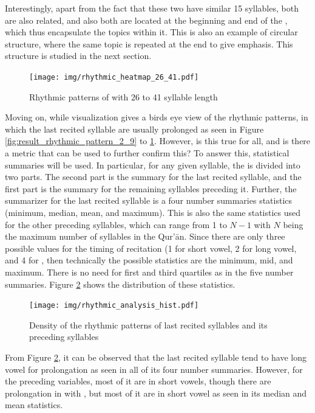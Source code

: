 Interestingly, apart from the fact that these two   have similar 15 syllables, both are also related, and also both are located at the beginning and end of the  , which thus encapsulate the topics within it. This is also an example of circular structure, where the same topic is repeated at the end to give emphasis. This structure is studied in the next section.

\begin{figure}[!t]
    \centering
    \texttt{[image: img/rhythmic\_heatmap\_26\_41.pdf]}
    \caption{Rhythmic patterns of   with 26 to 41 syllable length}
    \label{fig:result_rhythmic_pattern_26_41}
\end{figure}

Moving on, while visualization gives a birds eye view of the rhythmic patterns, in which the last recited syllable are usually prolonged as seen in Figure \ref{fig:result_rhythmic_pattern_2_9} to \ref{fig:result_rhythmic_pattern_26_41}. However, is this true for all, and is there a metric that can be used to further confirm this? To answer this, statistical summaries will be used. In particular, for any given syllable, the   is divided into two parts. The second part is the summary for the last recited syllable, and the first part is the summary for the remaining syllables preceding it. Further, the summarizer for the last recited syllable is a four number summaries statistics (minimum, median, mean, and maximum). This is also the same statistics used for the other preceding syllables, which can range from 1 to $N-1$ with $N$ being the maximum number of syllables in the Qur'\=an. Since there are only three possible values for the timing of recitation (1 for short vowel, 2 for long vowel, and 4 for  , then technically the possible statistics are the minimum, mid, and maximum. There is no need for first and third quartiles as in the five number summaries. Figure \ref{fig:result_rhythmic_hist} shows the distribution of these statistics.

\begin{figure}[!t]
    \centering
    \texttt{[image: img/rhythmic\_analysis\_hist.pdf]}
    \caption{Density of the rhythmic patterns of last recited syllables and its preceding syllables}
    \label{fig:result_rhythmic_hist}
\end{figure}

From Figure \ref{fig:result_rhythmic_hist}, it can be observed that the last recited syllable tend to have long vowel for prolongation as seen in all of its four number summaries. However, for the preceding variables, most of it are in short vowels, though there are prolongation in with  , but most of it are in short vowel as seen in its median and mean statistics. 

